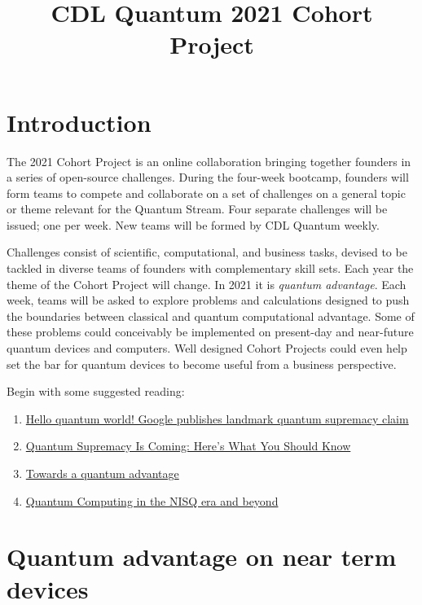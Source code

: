 \documentclass[12pt]{article}
\title{CDL Quantum 2021 Cohort Project}
\begin{document}
\maketitle

\thispagestyle{empty}
\section{Introduction}

The 2021 Cohort Project is an online collaboration bringing together founders in a series of open-source challenges.
During the four-week bootcamp, founders will form teams to compete and collaborate on a set of challenges on a general topic or theme
relevant for the Quantum Stream.  Four separate challenges will be issued; one per week.  New teams will be formed by CDL Quantum weekly.

Challenges consist of scientific, computational, and business tasks, devised to be tackled in diverse teams of founders with complementary skill sets.  Each year the theme of the Cohort Project will change.  In 2021 it is {\it quantum advantage}.  
Each week, teams will be asked to explore problems and calculations designed to push the boundaries between classical
and quantum computational advantage.
Some of these problems could conceivably be implemented on present-day and near-future quantum devices and computers.
Well designed Cohort Projects could even help set the bar for quantum devices to become useful from a business perspective.

Begin with some suggested reading:
\begin{enumerate}
\item \href{https://www.nature.com/articles/d41586-019-03213-z}{Hello quantum world! Google publishes landmark quantum supremacy claim}
\item \href{https://physicsworld.com/a/towards-a-quantum-advantage/}{Quantum Supremacy Is Coming: Here's What You Should Know}
\item \href{https://physicsworld.com/a/towards-a-quantum-advantage/}{Towards a quantum advantage}
\item \href{https://arxiv.org/abs/1801.00862}{Quantum Computing in the NISQ era and beyond}
\end{enumerate}


\section{Quantum advantage on near term devices}
\end{document}
